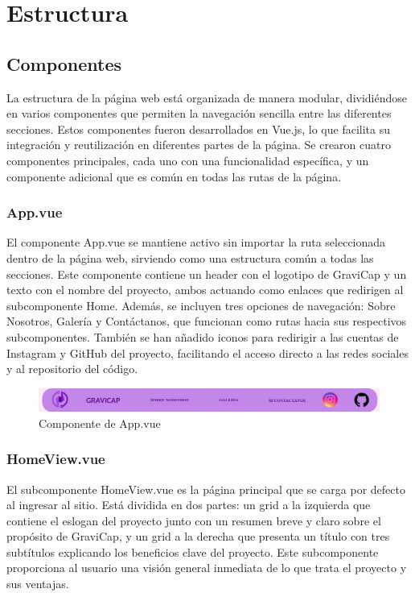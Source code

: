     \section{Estructura}
            \subsection{Componentes}
                La estructura de la página web está organizada de manera modular, dividiéndose en varios componentes que permiten la navegación sencilla entre las diferentes secciones. Estos componentes fueron desarrollados en Vue.js, lo que facilita su integración y reutilización en diferentes partes de la página. Se crearon cuatro componentes principales, cada uno con una funcionalidad específica, y un componente adicional que es común en todas las rutas de la página.\par
                
                \subsubsection{App.vue}
                    El componente App.vue se mantiene activo sin importar la ruta seleccionada dentro de la página web, sirviendo como una estructura común a todas las secciones. Este componente contiene un header con el logotipo de \textcolor{dark_violet}{GraviCap} y un texto con el nombre del proyecto, ambos actuando como enlaces que redirigen al subcomponente Home. Además, se incluyen tres opciones de navegación: Sobre Nosotros, Galería y Contáctanos, que funcionan como rutas hacia sus respectivos subcomponentes. También se han añadido iconos para redirigir a las cuentas de Instagram y GitHub del proyecto, facilitando el acceso directo a las redes sociales y al repositorio del código.\par
                    
                    \begin{figure}[!ht]
                        \centering
                        \includegraphics[width=\linewidth]{Página Web/App.png}
                        \caption{Componente de App.vue}
                        \label{fig:pw1}
                    \end{figure}
                    
                \subsubsection{HomeView.vue}
                    El subcomponente HomeView.vue es la página principal que se carga por defecto al ingresar al sitio. Está dividida en dos partes: un grid a la izquierda que contiene el eslogan del proyecto junto con un resumen breve y claro sobre el propósito de \textcolor{dark_violet}{GraviCap}, y un grid a la derecha que presenta un título con tres subtítulos explicando los beneficios clave del proyecto. Este subcomponente proporciona al usuario una visión general inmediata de lo que trata el proyecto y sus ventajas.\par
                    
